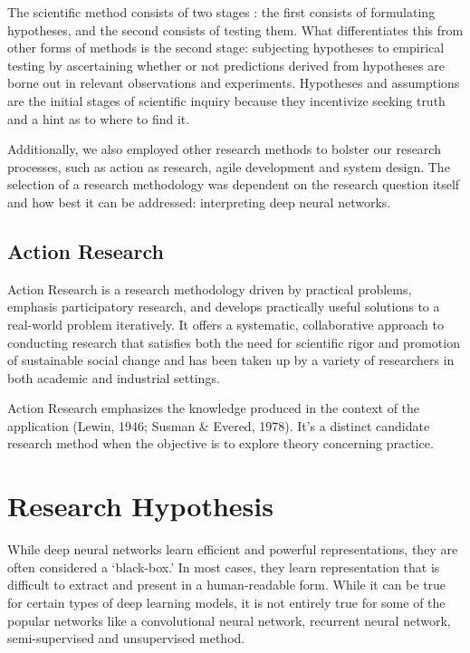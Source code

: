 The scientific method consists of two stages \cite{2016397}: the first consists of formulating hypotheses, and the second consists of testing them. What differentiates this from other forms of methods is the second stage: subjecting hypotheses to empirical testing by ascertaining whether or not predictions derived from hypotheses are borne out in relevant observations and experiments. Hypotheses and assumptions are the initial stages of scientific inquiry because they incentivize seeking truth and a hint as to where to find it. \cite{AYALA2016xi}

Additionally, we also employed other research methods to bolster our research processes, such as action as research, agile development and system design. The selection of a research methodology was dependent on the research question itself and how best it can be addressed: interpreting deep neural networks.

\subsection{Action Research}
Action Research is a research methodology driven by practical problems, emphasis participatory research, and develops practically useful solutions to a real-world problem iteratively. It offers a systematic, collaborative approach to conducting research that satisfies both the need for scientific rigor and promotion of sustainable social change and has been taken up by a variety of researchers in both academic and industrial settings. \cite{Hayes:2011:RAR:1993060.1993065}

Action Research emphasizes the knowledge produced in the context of the application (Lewin, 1946; Susman \& Evered, 1978). It’s a distinct candidate research method when the objective is to explore theory concerning practice.

\section{Research Hypothesis}

While deep neural networks learn efficient and powerful representations, they are often considered a ‘black-box.’ In most cases, they learn representation that is difficult to extract and present in a human-readable form. While it can be true for certain types of deep learning models, it is not entirely true for some of the popular networks like a convolutional neural network, recurrent neural network, semi-supervised and unsupervised method.

